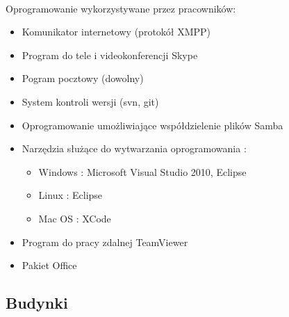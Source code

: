 \paragraph{}
Oprogramowanie wykorzystywane przez pracowników:
\begin{itemize}
  \item Komunikator internetowy (protokół XMPP)
  \item Program do tele i videokonferencji Skype
  \item Pogram pocztowy (dowolny)
  \item System kontroli wersji (svn, git)
  \item Oprogramowanie umożliwiające współdzielenie plików Samba
  \item Narzędzia służące do wytwarzania oprogramowania :
  \begin{itemize}
	\item Windows : Microsoft Visual Studio 2010, Eclipse
	\item Linux : Eclipse
	\item Mac OS : XCode
  \end{itemize}
  \item Program do pracy zdalnej TeamViewer
 \item Pakiet Office
\end{itemize}

\subsection{Budynki}




